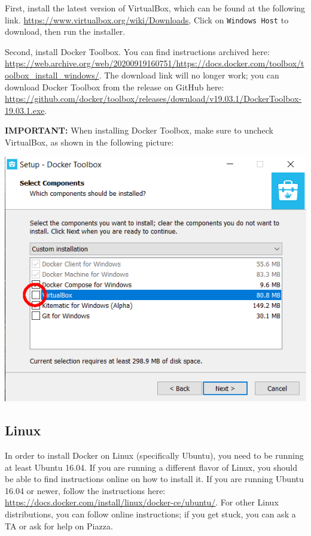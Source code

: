 First, install the latest version of VirtualBox, which can be found at the following link.
\url{https://www.virtualbox.org/wiki/Downloads}, Click on \texttt{Windows Host} to download, then run the installer.

Second, install Docker Toolbox. You can find instructions archived here:
\url{https://web.archive.org/web/20200919160751/https://docs.docker.com/toolbox/toolbox_install_windows/}. The download link will no longer work; you can download Docker Toolbox from the release on GitHub here: \url{https://github.com/docker/toolbox/releases/download/v19.03.1/DockerToolbox-19.03.1.exe}.

\textbf{IMPORTANT:} When installing Docker Toolbox, make sure to uncheck VirtualBox, as shown in the following picture:

\begin{center}
    \includegraphics[scale=0.5]{VBOX.png}
\end{center}

\subsection{Linux}
In order to install Docker on Linux (specifically Ubuntu), you need to be running at least Ubuntu 16.04. If you are running a different flavor of Linux, you should be able to find instructions online on how to install it. If you are running Ubuntu 16.04 or newer, follow the instructions here: \url{https://docs.docker.com/install/linux/docker-ce/ubuntu/}. For other Linux distributions, you can follow online instructions; if you get stuck, you can ask a TA or ask for help on Piazza.




